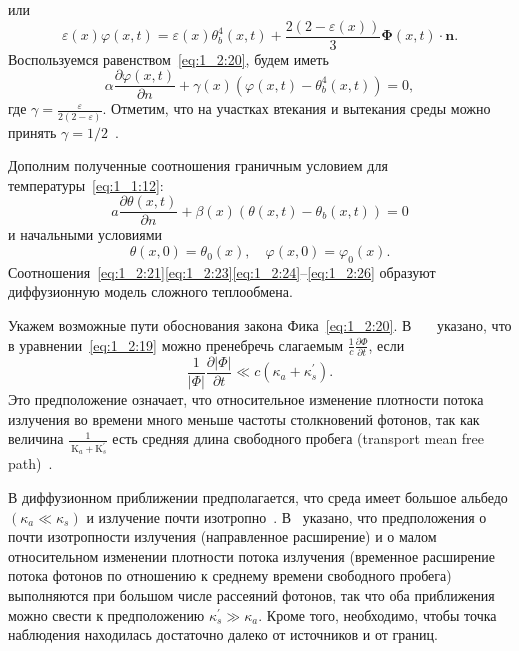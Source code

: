 или
\[
    \varepsilon(x) \varphi(x, t)=\varepsilon(x) \theta_{b}^{4}(x, t)+
    \frac{2(2-\varepsilon(x))}{3} \boldsymbol{\Phi}(x, t) \cdot \mathbf{n}.
\]
Воспользуемся равенством~\eqref{eq:1_2:20}, будем иметь
\begin{equation}
    \label{eq:1_2:24}
    \alpha \frac{\partial \varphi(x, t)}{\partial n}+
    \gamma(x)\left(\varphi(x, t)-\theta_{b}^{4}(x, t)\right)=0,
\end{equation}
где $\gamma=\frac{\varepsilon}{2(2-\varepsilon)}$.
Отметим, что на участках втекания и вытекания среды
можно принять $\gamma=1/2$~\cite{JVM-14}.


Дополним полученные соотношения граничным условием для температуры~\eqref{eq:1_1:12}:
\begin{equation}
    \label{eq:1_2:25}
    a \frac{\partial \theta(x, t)}{\partial n}
    +\beta(x)\left(\theta(x, t)-\theta_{b}(x, t)\right)=0
\end{equation}
и начальными условиями
\begin{equation}
    \label{eq:1_2:26}
    \theta(x, 0)=\theta_{0}(x), \quad \varphi(x, 0)=\varphi_{0}(x).
\end{equation}
Соотношения~\eqref{eq:1_2:21}\eqref{eq:1_2:23}\eqref{eq:1_2:24}--\eqref{eq:1_2:26}
образуют диффузионную модель сложного теплообмена.

Укажем возможные пути обоснования закона Фика~\eqref{eq:1_2:20}.
В~\cite[136]{DuderstadtHamilton1976}~\cite[222]{DuderstadtMartin1979}~\cite[96]{WangWu2007}
указано,
что в уравнении~\eqref{eq:1_2:19} можно пренебречь
слагаемым $\frac{1}{c} \frac{\partial \Phi}{\partial t}$, если
\[
    \frac{1}{|\Phi|} \frac{\partial|\Phi|}{\partial t}
    \ll c\left(\kappa_{a}+\kappa_{s}^{\prime}\right).
\]
Это предположение означает, что относительное изменение плотности
потока излучения во времени много
меньше частоты столкновений фотонов, так как величина
$\frac{1}{\mathrm{~K}_{a}+\mathrm{K}_{s}^{\prime}}$ есть средняя длина
свободного пробега (transport mean free path)~\cite{WangWu2007}.

В диффузионном приближении предполагается,
что среда имеет большое альбедо $\left(\kappa_{a} \ll \kappa_{s}\right)$ и
излучение почти изотропно~\cite[88]{WangWu2007}.
В~\cite[97]{WangWu2007} указано, что предположения
о почти изотропности излучения
(направленное расширение) и о малом относительном изменении
плотности потока излучения (временное расширение потока
фотонов по отношению к среднему времени свободного пробега)
выполняются при большом числе рассеяний фотонов,
так что оба приближения можно свести к
предположению $\kappa_{s}^{\prime} \gg \kappa_{a}$.
Кроме того, необходимо, чтобы точка наблюдения находилась
достаточно далеко от источников и от границ.

